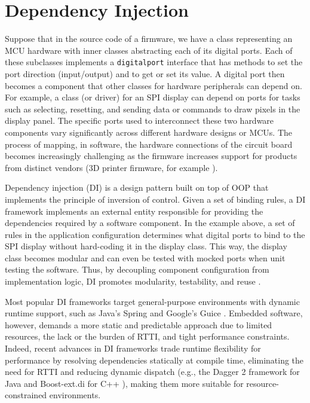 \documentclass[10pt,sigplan,screen,anonymous]{acmart}
\begin{document}
\section{Dependency Injection} \label{sec:di}
 
Suppose that in the source code of a firmware, we have a class representing an MCU hardware with inner classes abstracting each of its digital ports. Each of these subclasses implements a {\tt digitalport} interface that has methods to set the port direction (input/output) and to get or set its value. A digital port then becomes a component that other classes for hardware peripherals can depend on. For example, a class (or driver) for an SPI display can depend on ports for tasks such as selecting, resetting, and sending data or commands to draw pixels in the display panel. The specific ports used to interconnect these two hardware components vary significantly across different hardware designs or MCUs. The process of mapping, in software, the hardware connections of the circuit board becomes increasingly challenging as the firmware increases support for products from distinct vendors (3D printer firmware, for example \cite{marlinfwm2025}).
 
Dependency injection (DI) \cite{seemann2019dependency} is a design pattern built on top of OOP that implements the principle of inversion of control. Given a set of binding rules, a DI framework implements an external entity responsible for providing the dependencies required by a software component. In the example above, a set of rules in the application configuration determines what digital ports to bind to the SPI display without hard-coding it in the display class. This way, the display class becomes modular and can even be tested with mocked ports when unit testing the software. Thus, by decoupling component configuration from implementation logic, DI promotes modularity, testability, and reuse \cite{seemann2019dependency,garousi2019}.

Most popular DI frameworks target general-purpose environments with dynamic runtime support, such as Java's Spring \cite{fowler2004} and Google's Guice \cite{schaefer2008guice}. Embedded software, however, demands a more static and predictable approach due to limited resources, the lack or the burden of RTTI, and tight performance constraints. Indeed, recent advances in DI frameworks trade runtime flexibility for performance by resolving dependencies statically at compile time, eliminating the need for RTTI and reducing dynamic dispatch (e.g., the Dagger 2 framework \cite{dagger2} for Java and Boost-ext.di for C++ \cite{boostdi2018}), making them more suitable for resource-constrained environments.
\end{document}
